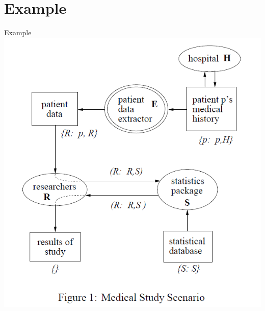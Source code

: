 \documentclass[10pt]{beamer}
\begin{document}
\section{Example}
\begin{frame}{Example}{}
	\centering
	\includegraphics[height=.7\paperheight]{hospital_example.png}
\end{frame}
\end{document}
